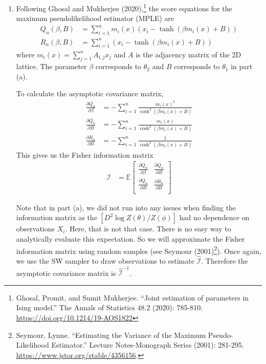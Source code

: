 \documentclass[11pt]{article}
\newcommand{\E}{\mathbb{E}}
\begin{document}
\begin{enumerate}
\begin{enumerate}
\item Following Ghosal and Mukherjee (2020),\footnote{Ghosal, Promit, and Sumit Mukherjee. ``Joint estimation of parameters in Ising model.'' The Annals of Statistics 48.2 (2020): 785-810. \url{https://doi.org/10.1214/19-AOS1822}} the score equations for the maximum pseudolikelihood estimator (MPLE) are
\begin{align*}
	Q_n(\beta, B) &= \sum_{i=1}^n m_i(x) (x_i - \tanh(\beta m_i(x) + B)) \\
	R_n(\beta, B) &= \sum_{i=1}^n (x_i - \tanh(\beta m_i(x) + B))
\end{align*}
where $m_i(x) = \sum_{j=1}^n A_{i,j} x_j$ and $A$ is the adjacency matrix of the 2D lattice. The parameter $\beta$ corresponds to $\theta_2$ and $B$ corresponds to $\theta_1$ in part (a).

To calculate the asymptotic covariance matrix,
\begin{align*}
	\frac{\partial Q_n}{\partial \beta} &= - \sum_{i=1}^n \frac{m_i(x)^2}{\cosh^2(\beta m_i(x) + B)} \\
	\frac{\partial Q_n}{\partial B} &= - \sum_{i=1}^n \frac{m_i(x)}{\cosh^2(\beta m_i(x) + B)} \\
	\frac{\partial R_n}{\partial B} &= - \sum_{i=1}^n \frac{1}{\cosh^2(\beta m_i(x) + B)}
\end{align*}
This gives us the Fisher information matrix
\begin{align*}
	\mathcal{I} &=  \E \begin{bmatrix}
	\frac{\partial Q_n}{\partial \beta} & \frac{\partial Q_n}{\partial B} \\
	\frac{\partial Q_n}{\partial B} & \frac{\partial R_n}{\partial B} \\
	\end{bmatrix}
\end{align*}

Note that in part (a), we did not run into any issues when finding the information matrix as the $[D^2 \log Z(\theta) / Z(\phi)]$ had no dependence on observations $X_i$. Here, that is not that case. There is no easy way to analytically evaluate this expectation. So we will approximate the Fisher information matrix using random samples (see Seymour (2001)\footnote{Seymour, Lynne. ``Estimating the Variance of the Maximum Pseudo-Likelihood Estimator.'' Lecture Notes-Monograph Series (2001): 281-295. \url{https://www.jstor.org/stable/4356156}.}). Once again, we use the SW sampler to draw observations to estimate $\widehat{\mathcal{I}}$. Therefore the asymptotic covariance matrix is $\widehat{\mathcal{I}}^{-1}$.


\end{enumerate}
\end{enumerate}
\end{document}
